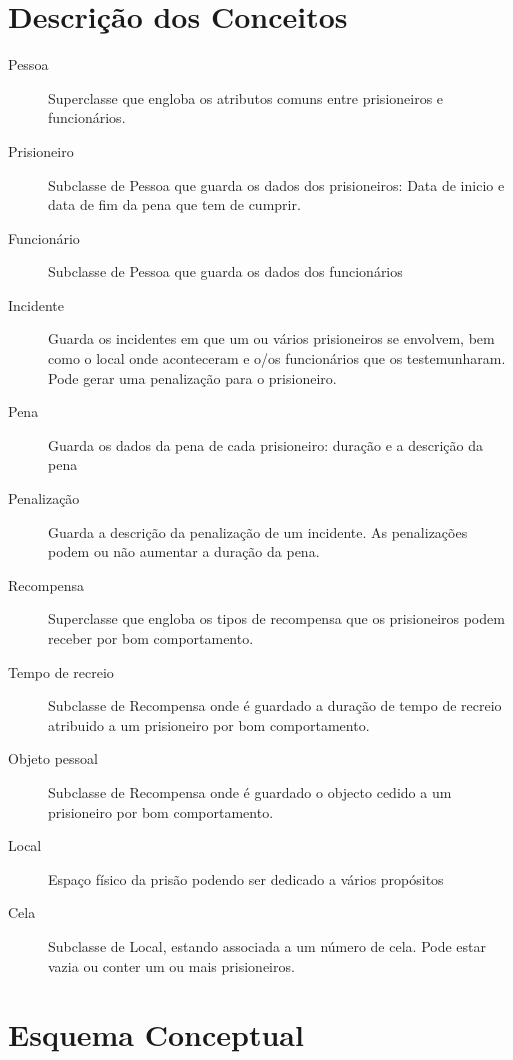 \documentclass{article}
\begin{document}
\section{Descrição dos Conceitos}
\begin{description}
\item[Pessoa] Superclasse que engloba os atributos comuns entre prisioneiros e funcionários.
\item[Prisioneiro] Subclasse de Pessoa que guarda os dados dos prisioneiros: Data de inicio e
data de fim da pena que tem de cumprir.
\item[Funcionário] Subclasse de Pessoa que guarda os dados dos funcionários
\item[Incidente] Guarda os incidentes em que um ou vários prisioneiros se envolvem, bem como o local onde aconteceram e o/os funcionários que os testemunharam. Pode gerar uma penalização para o prisioneiro.
\item[Pena] Guarda os dados da pena de cada prisioneiro: duração e a descrição da pena
\item[Penalização] Guarda a descrição da penalização de um incidente. As penalizações podem ou
não aumentar a duração da pena.
\item[Recompensa] Superclasse que engloba os tipos de recompensa que os prisioneiros podem receber por bom comportamento.
\item[Tempo de recreio] Subclasse de Recompensa onde é guardado a duração de tempo de recreio atribuido a um prisioneiro por bom comportamento.
\item[Objeto pessoal] Subclasse de Recompensa onde é guardado o objecto cedido a um prisioneiro por bom comportamento.
\item[Local] Espaço físico da prisão podendo ser dedicado a vários propósitos
\item[Cela] Subclasse de Local, estando associada a um número de cela. Pode estar vazia ou conter um ou mais prisioneiros.
\end{description}
\newpage
\section{Esquema Conceptual}
\begin{center}
\end{center}
\newpage
\end{document}
